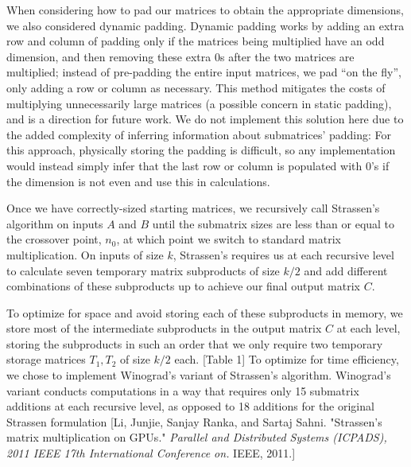\documentclass[a4paper]{article}
\begin{document}
When considering how to pad our matrices to obtain the appropriate dimensions, we also considered dynamic padding. Dynamic padding works by adding an extra row and column of padding only if the matrices being multiplied have an odd dimension, and then removing these extra 0s after the two matrices are multiplied; instead of pre-padding the entire input matrices, we pad ``on the fly'', only adding a row or column as necessary. This method mitigates the costs of multiplying unnecessarily large matrices (a possible concern in static padding), and is a direction for future work. We do not implement this solution here due to the added complexity of inferring information about submatrices' padding: For this approach, physically storing the padding is difficult, so any implementation would instead simply infer that the last row or column is populated with 0's if the dimension is not even and use this in calculations.

Once we have correctly-sized starting matrices, we recursively call Strassen's algorithm on inputs $A$ and $B$ until the submatrix sizes are less than or equal to the crossover point, $n_0$, at which point we switch to standard matrix multiplication. On inputs of size $k$, Strassen's requires us at each recursive level to calculate seven temporary matrix subproducts of size $k/2$ and add different combinations of these subproducts up to achieve our final output matrix $C$. 

To optimize for space and avoid storing each of these subproducts in memory, we store most of the intermediate subproducts in the output matrix $C$ at each level, storing the subproducts in such an order that we only require two temporary storage matrices $T_1, T_2$ of size $k/2$ each. [Table 1] To optimize for time efficiency, we chose to implement Winograd's variant of Strassen's algorithm. Winograd's variant conducts computations in a way that requires only 15 submatrix additions at each recursive level, as opposed to 18 additions for the original Strassen formulation [Li, Junjie, Sanjay Ranka, and Sartaj Sahni. "Strassen's matrix multiplication on GPUs." \textit{Parallel and Distributed Systems (ICPADS), 2011 IEEE 17th International Conference on.} IEEE, 2011.]
\end{document}
